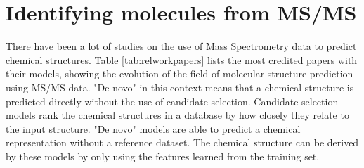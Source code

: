 \section{Identifying molecules from \ac{MS/MS}}
\label{sec:relatedwork}

There have been a lot of studies on the use of Mass Spectrometry data to predict chemical structures. Table \ref{tab:relworkpapers} lists the most credited papers with their models, showing the evolution of the field of molecular structure prediction using MS/MS data.
"De novo" in this context means that a chemical structure is predicted directly without the use of candidate selection. Candidate selection models rank the chemical structures in a database by how closely they relate to the input structure. "De novo" models are able to predict a chemical representation without a reference dataset. The chemical structure can be derived by these models by only using the features learned from the training set.

